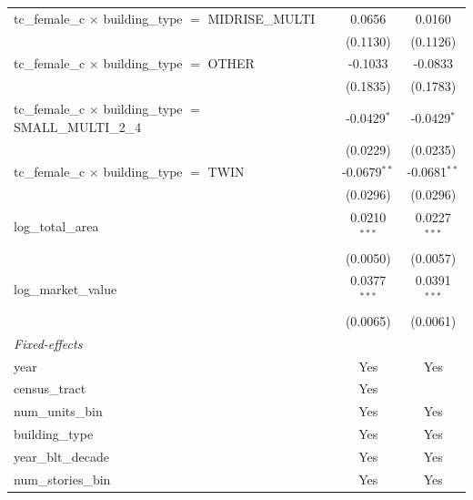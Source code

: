\begin{tabular}{lcc}
   tc\_female\_c $\times$ building\_type $=$ MIDRISE\_MULTI            & 0.0656         & 0.0160\\   
                                                                       & (0.1130)       & (0.1126)\\   
   tc\_female\_c $\times$ building\_type $=$ OTHER                     & -0.1033        & -0.0833\\   
                                                                       & (0.1835)       & (0.1783)\\   
   tc\_female\_c $\times$ building\_type $=$ SMALL\_MULTI\_2\_4        & -0.0429$^{*}$  & -0.0429$^{*}$\\   
                                                                       & (0.0229)       & (0.0235)\\   
   tc\_female\_c $\times$ building\_type $=$ TWIN                      & -0.0679$^{**}$ & -0.0681$^{**}$\\   
                                                                       & (0.0296)       & (0.0296)\\   
   log\_total\_area                                                    & 0.0210$^{***}$ & 0.0227$^{***}$\\   
                                                                       & (0.0050)       & (0.0057)\\   
   log\_market\_value                                                  & 0.0377$^{***}$ & 0.0391$^{***}$\\   
                                                                       & (0.0065)       & (0.0061)\\   
   \midrule
   \emph{Fixed-effects}\\
   year                                                                & Yes            & Yes\\  
   census\_tract                                                       & Yes            & \\  
   num\_units\_bin                                                     & Yes            & Yes\\  
   building\_type                                                      & Yes            & Yes\\  
   year\_blt\_decade                                                   & Yes            & Yes\\  
   num\_stories\_bin                                                   & Yes            & Yes\\  

\end{tabular}
